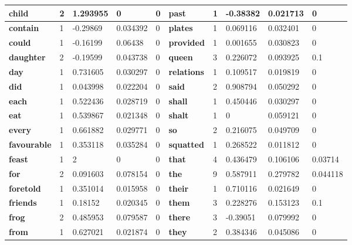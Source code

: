 \begin{table}[]
\begin{tabular}{|l|l|l|l|l|l|l|l|l|l|}
\textbf{child}         & 2 & 1.293955 & 0        & 0        & \textbf{past}      & 1 & -0.38382 & 0.021713 & 0        \\ \hline
\textbf{contain}       & 1 & -0.29869 & 0.034392 & 0        & \textbf{plates}    & 1 & 0.069116 & 0.032401 & 0        \\ \hline
\textbf{could}         & 1 & -0.16199 & 0.06438  & 0        & \textbf{provided}  & 1 & 0.001655 & 0.030823 & 0        \\ \hline
\textbf{daughter}      & 2 & -0.19599 & 0.043738 & 0        & \textbf{queen}     & 3 & 0.226072 & 0.093925 & 0.1      \\ \hline
\textbf{day}           & 1 & 0.731605 & 0.030297 & 0        & \textbf{relations} & 1 & 0.109517 & 0.019819 & 0        \\ \hline
\textbf{did}           & 1 & 0.043998 & 0.022204 & 0        & \textbf{said}      & 2 & 0.908794 & 0.050292 & 0        \\ \hline
\textbf{each}          & 1 & 0.522436 & 0.028719 & 0        & \textbf{shall}     & 1 & 0.450446 & 0.030297 & 0        \\ \hline
\textbf{eat}           & 1 & 0.539867 & 0.021348 & 0        & \textbf{shalt}     & 1 & 0        & 0.059121 & 0        \\ \hline
\textbf{every}         & 1 & 0.661882 & 0.029771 & 0        & \textbf{so}        & 2 & 0.216075 & 0.049709 & 0        \\ \hline
\textbf{favourable}    & 1 & 0.353118 & 0.035284 & 0        & \textbf{squatted}  & 1 & 0.268522 & 0.011812 & 0        \\ \hline
\textbf{feast}         & 1 & 2        & 0        & 0        & \textbf{that}      & 4 & 0.436479 & 0.106106 & 0.03714 \\ \hline
\textbf{for}           & 2 & 0.091603 & 0.078154 & 0        & \textbf{the}       & 9 & 0.587911 & 0.279782 & 0.044118 \\ \hline
\textbf{foretold}      & 1 & 0.351014 & 0.015958 & 0        & \textbf{their}     & 1 & 0.710116 & 0.021649 & 0        \\ \hline
\textbf{friends}       & 1 & 0.18152  & 0.020345 & 0        & \textbf{them}      & 3 & 0.228276 & 0.153123 & 0.1      \\ \hline
\textbf{frog}          & 2 & 0.485953 & 0.079587 & 0        & \textbf{there}     & 3 & -0.39051 & 0.079992 & 0        \\ \hline
\textbf{from}          & 1 & 0.627021 & 0.021874 & 0        & \textbf{they}      & 2 & 0.384346 & 0.045086 & 0        \\ \hline

\end{tabular}
\end{table}
